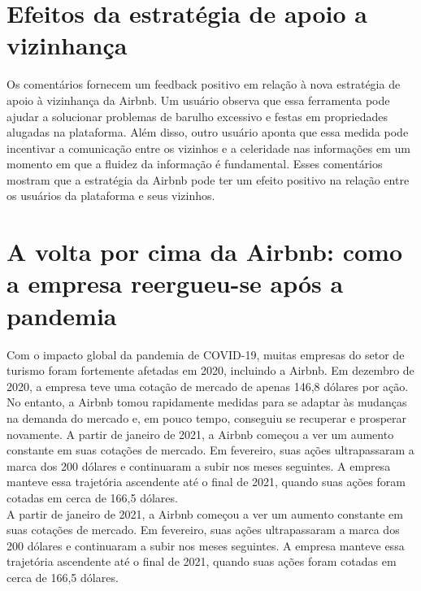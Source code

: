 \documentclass{article}
\begin{document}
\section*{Efeitos da estratégia de apoio a vizinhança}

Os comentários fornecem um feedback positivo em relação à nova estratégia de apoio à vizinhança da Airbnb. Um usuário observa que essa ferramenta pode ajudar a solucionar problemas de barulho excessivo e festas em propriedades alugadas na plataforma. Além disso, outro usuário aponta que essa medida pode incentivar a comunicação entre os vizinhos e a celeridade nas informações em um momento em que a fluidez da informação é fundamental. Esses comentários mostram que a estratégia da Airbnb pode ter um efeito positivo na relação entre os usuários da plataforma e seus vizinhos.
\newpage
\section*{A volta por cima da Airbnb: como a empresa reergueu-se após a pandemia}
Com o impacto global da pandemia de COVID-19, muitas empresas do setor de turismo foram fortemente afetadas em 2020, incluindo a Airbnb. Em dezembro de 2020, a empresa teve uma cotação de mercado de apenas 146,8 dólares por ação. No entanto, a Airbnb tomou rapidamente medidas para se adaptar às mudanças na demanda do mercado e, em pouco tempo, conseguiu se recuperar e prosperar novamente.
A partir de janeiro de 2021, a Airbnb começou a ver um aumento constante em suas cotações de mercado. Em fevereiro, suas ações ultrapassaram a marca dos 200 dólares e continuaram a subir nos meses seguintes. A empresa manteve essa trajetória ascendente até o final de 2021, quando suas ações foram cotadas em cerca de 166,5 dólares.
\\
A partir de janeiro de 2021, a Airbnb começou a ver um aumento constante em suas cotações de mercado. Em fevereiro, suas ações ultrapassaram a marca dos 200 dólares e continuaram a subir nos meses seguintes. A empresa manteve essa trajetória ascendente até o final de 2021, quando suas ações foram cotadas em cerca de 166,5 dólares.
\end{document}
